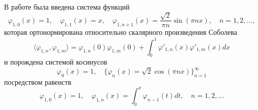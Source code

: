 В работе \cite{RamShaMag} была введена система функций
\begin{equation}\label{GasRam-eq1}
 \varphi_{1,0}(x)=1,\quad \varphi_{1,1}(x)=x,\quad \varphi_{1,n+1}(x)=\frac{\sqrt{2}}{\pi n}\sin(\pi nx),\quad n=1,2,\ldots,
\end{equation}
которая ортонормирована относительно скалярного произведения Соболева
\begin{equation*}
\langle\varphi_{1,n},\varphi_{1,m}\rangle=\varphi_{1,n}(0)\varphi_{1,m}(0)+\int_0^1\varphi'_{1,n}(x)\varphi'_{1,m}(x)dx
\end{equation*}
и порождена системой косинусов
\begin{equation}\label{GasRam-eq2}
\varphi_0(x)=1,\quad \{\varphi_n(x)=\sqrt{2}\cos(\pi nx)\}_{n=1}^\infty
\end{equation}
посредством равенств
$$
 \varphi_{1,0}(x)=1,\quad \varphi_{1,n}(x)=\int_0^x \varphi_{n-1}(t)dt, \quad n=1,2,\ldots
$$

